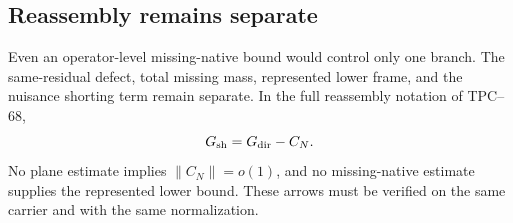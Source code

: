 \subsection{Reassembly remains separate}

Even an operator-level missing-native bound would control only one branch.
The same-residual defect, total missing mass, represented lower frame, and
the nuisance shorting term remain separate.  In the full reassembly notation
of TPC--68,
\[
 G_{\rm sh}=G_{\rm dir}-C_N.
\]
No plane estimate implies \(\|C_N\|=o(1)\), and no missing-native estimate
supplies the represented lower bound.  These arrows must be verified on
the same carrier and with the same normalization.
